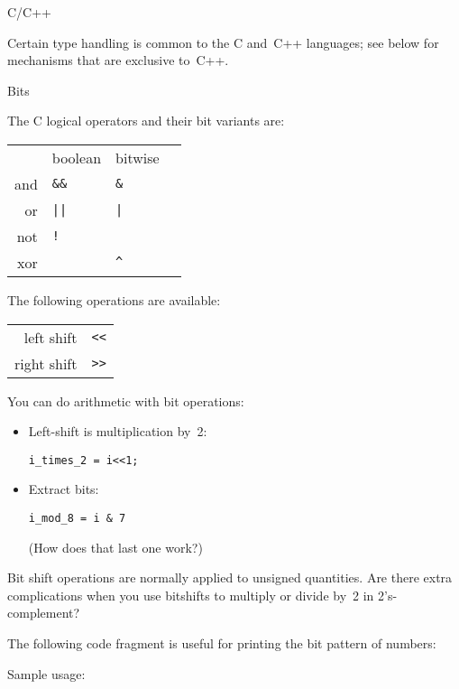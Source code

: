 
 {C/C++}

Certain type handling is common to the C and~C++ languages;
see below for mechanisms that are exclusive to~C++.

 {Bits}

The C logical operators and their  bit variants are:

\begin{tabular}{rlll}
  \toprule
  &boolean&bitwise \\
  and&\verb+&&+ & \verb+&+ \\
  or &\verb+||+ & \verb+|+ \\
  not&\verb+!+  &          \\
  xor&          & \verb+^+ \\
  \bottomrule
\end{tabular}

The following  operations are available:

\begin{tabular}{rl}
  \toprule
  left  shift& \verb+<<+ \\
  right shift& \verb+>>+ \\
  \bottomrule
\end{tabular}

You can do arithmetic with bit operations:
  \begin{itemize}
  \item Left-shift is multiplication by~2:\\
\begin{lstlisting}
i_times_2 = i<<1;
\end{lstlisting}
\item Extract bits:
\begin{lstlisting}
i_mod_8 = i & 7
\end{lstlisting}
(How does that last one work?)
  \end{itemize}

\begin{exercise}
  Bit shift operations are normally applied to unsigned quantities.
  Are there extra complications when you use bitshifts to multiply or
  divide by~2 in 2's-complement?
\end{exercise}

The following code fragment is useful for printing the bit pattern of numbers:

Sample usage:


